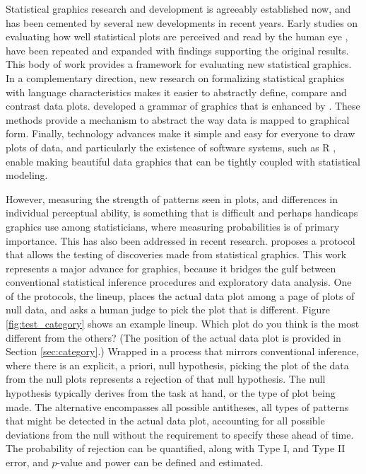 \documentclass[12pt]{article}
\begin{document}
Statistical graphics research and development is agreeably established now, and has been cemented by several new developments in recent years. Early studies on evaluating how well statistical plots are perceived and read by the human eye \citep{cleveland:1984}, have been repeated and expanded \citep{simkin:1987,spence:1991, heer:2010} with findings supporting the original results. This body of work provides a framework for evaluating new statistical graphics.  In a complementary direction, new research on formalizing statistical graphics with language characteristics makes it easier to abstractly define, compare and contrast data plots. \cite{wilkinson:1999} developed a grammar of graphics that is enhanced by \cite{hadley:2009}. These methods provide a mechanism to abstract the way data is mapped to graphical form. Finally, technology advances make it simple and easy for everyone to draw plots of data, and particularly the existence of software systems, such as R \citep{R}, enable making beautiful data graphics that can be tightly coupled with statistical modeling.

However, measuring the strength of patterns seen in plots, and differences in individual perceptual ability, is something that is difficult and perhaps handicaps graphics  use among statisticians, where measuring probabilities is of primary importance. This has also been addressed in recent research. \citet{buja:2009} proposes a protocol that allows the testing of discoveries made from statistical graphics. This work represents a major advance for graphics, because it bridges the gulf between conventional statistical inference procedures and exploratory data analysis. One of the protocols, the lineup, places the actual data plot among  a page of plots of null data, and asks a human judge to pick the plot that is different. Figure \ref{fig:test_category} shows an example lineup. Which plot do you think is the most different from the others? (The position of the actual data plot is provided in Section \ref{sec:category}.) Wrapped in a process that mirrors conventional inference, where there is an explicit, a priori, null hypothesis, picking the plot of the data from the null plots represents a rejection of that null hypothesis. The null hypothesis typically derives from the task at hand, or the type of plot being made. The alternative encompasses all possible antitheses, all types of patterns that might be detected in the actual data plot, accounting for all possible deviations from the null without the requirement to specify these ahead of time. The probability of rejection can be quantified, along with Type I, and Type II error, and $p$-value and power can be defined and estimated. 
\end{document}
